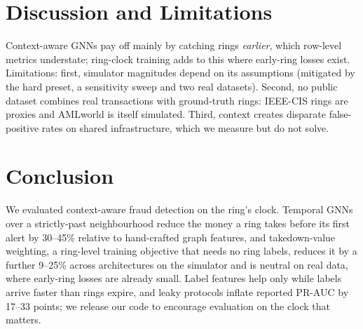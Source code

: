 \documentclass[10pt,letterpaper]{article}
\begin{document}
\section{Discussion and Limitations}
Context-aware GNNs pay off mainly by catching rings \emph{earlier}, which row-level metrics understate; ring-clock training adds to this where early-ring losses exist. Limitations: first, simulator magnitudes depend on its assumptions (mitigated by the hard preset, a sensitivity sweep and two real datasets). Second, no public dataset combines real transactions with ground-truth rings: IEEE-CIS rings are proxies and AMLworld is itself simulated. Third, context creates disparate false-positive rates on shared infrastructure, which we measure but do not solve.

\section{Conclusion}
We evaluated context-aware fraud detection on the ring's clock. Temporal GNNs over a strictly-past neighbourhood reduce the money a ring takes before its first alert by 30--45\% relative to hand-crafted graph features, and takedown-value weighting, a ring-level training objective that needs no ring labels, reduces it by a further 9--25\% across architectures on the simulator and is neutral on real data, where early-ring losses are already small. Label features help only while labels arrive faster than rings expire, and leaky protocols inflate reported PR-AUC by 17--33 points; we release our code to encourage evaluation on the clock that matters.



\end{document}
